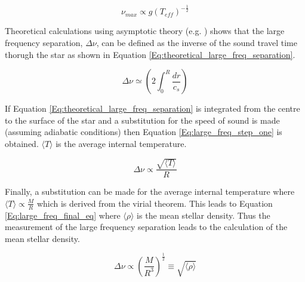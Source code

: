 \begin{equation}
    \nu_{max} \propto g(T_{eff})^{-\frac{1}{2}}
    \label{Eq:v_max_eq}
\end{equation}

Theoretical calculations using asymptotic theory (e.g. \citealt{Christensen_Dalsgaard_1988}) shows that the large frequency separation, $\Delta\nu$, can be defined as the inverse of the sound travel time thorugh the star as shown in Equation \ref{Eq:theoretical_large_freq_separation}.

\begin{equation}
    \Delta\nu \simeq \left(2 \int_{0}^{R} \frac{dr}{c_{s}} \right)
    \label{Eq:theoretical_large_freq_separation}
\end{equation}

If Equation \ref{Eq:theoretical_large_freq_separation} is integrated from the centre to the surface of the star and a substitution for the speed of sound is made (assuming adiabatic conditions) then Equation \ref{Eq:large_freq_step_one} is obtained. $\langle T \rangle$ is the average internal temperature.

\begin{equation}
    \Delta\nu \propto \frac{\sqrt{\langle T \rangle}}{R}
    \label{Eq:large_freq_step_one}
\end{equation}

Finally, a substitution can be made for the average internal temperature where $\langle T \rangle \propto \frac{M}{R}$ which is derived from the virial theorem. This leads to Equation \ref{Eq:large_freq_final_eq} where $\langle \rho \rangle$ is the mean stellar density. Thus the measurement of the large frequency separation leads to the calculation of the mean stellar density.

\begin{equation}
    \Delta\nu \propto \left(\frac{M}{R^{3}} \right)^{\frac{1}{2}} \equiv \sqrt{\langle \rho \rangle}
    \label{Eq:large_freq_final_eq}
\end{equation}

